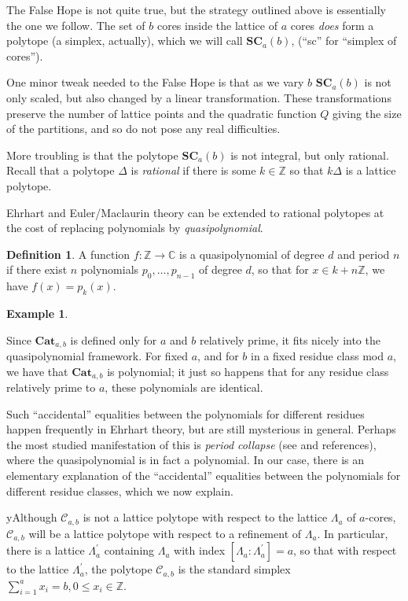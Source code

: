 \documentclass{amsart}[12pt]
\theoremstyle{definition}
\newtheorem{example}[dummy]{Example}
\newtheorem{definition}[dummy]{Definition}
\newcommand{\Z}{\mathbb{Z}}
\newcommand{\C}{\mathbb{C}}
\newcommand{\SC}{\mathbf{SC}}
\newcommand{\Cat}{\mathbf{Cat}}
\begin{document}
The False Hope is not quite true, but the strategy outlined above is essentially the one we follow.  The set of $b$ cores inside the lattice of $a$ cores \emph{does} form a polytope (a simplex, actually), which we will call $\SC_a(b)$, (``sc'' for ``simplex of cores'').  

One minor tweak needed to the False Hope is that as we vary $b$ $\SC_a(b)$ is not only scaled, but also changed by a linear transformation.  These transformations preserve the number of lattice points and the quadratic function $Q$ giving the size of the partitions, and so do not pose any real difficulties.

More troubling is that the polytope $\SC_{a}(b)$ is not integral, but only rational.  Recall that a polytope $\Delta$ is \emph{rational} if there is some $k\in\Z$ so that $k\Delta$ is a lattice polytope.   



Ehrhart and Euler/Maclaurin theory can be extended to rational polytopes at the cost of replacing polynomials by \emph{quasipolynomial}.  

\begin{definition}
A function $f:\Z\to\C$ is a quasipolynomial of degree $d$ and period $n$ if there exist $n$ polynomials $p_0,\dots, p_{n-1}$ of degree $d$, so that for $x\in k+n\Z$, we have $f(x)=p_k(x)$.
\end{definition}

\begin{example}

\end{example}

Since $\Cat_{a,b}$ is defined only for $a$ and $b$ relatively prime, it fits nicely into the quasipolynomial framework.  For fixed $a$, and for $b$ in a fixed residue class mod $a$, we have that $\Cat_{a,b}$ is polynomial; it just so happens that for any residue class relatively prime to $a$, these polynomials are identical.

Such ``accidental'' equalities between the polynomials for different residues happen frequently in Ehrhart theory, but are still mysterious in general.  Perhaps the most studied manifestation of this is \emph{period collapse} (see \cite{Haase} and references), where the quasipolynomial is in fact a polynomial.  In our case, there is an elementary explanation of the ``accidental'' equalities between the polynomials for different residue classes, which we now explain.

yAlthough $\mathcal{C}_{a,b}$ is not a lattice polytope with respect to the lattice $\Lambda_a$ of $a$-cores, $\mathcal{C}_{a,b}$ will be a lattice polytope with respect to a refinement of $\Lambda_a$.  In particular, there is a lattice $\Lambda_a^\prime$ containing $\Lambda_a$ with index $[\Lambda_a:\Lambda^\prime_a]=a$, so that with respect to the lattice $\Lambda_a^\prime$, the polytope $\mathcal{C}_{a,b}$ is the standard simplex $\sum_{i=1}^{a} x_i=b, 0\leq x_i\in \Z$.  
\end{document}
